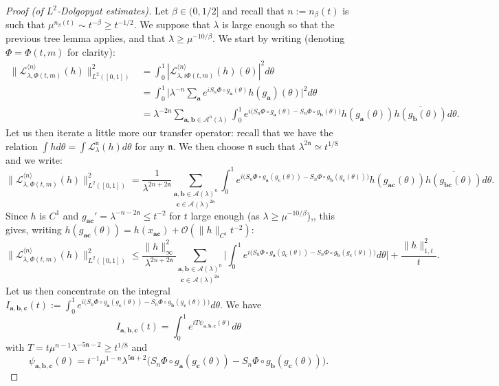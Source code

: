 \documentclass[11pt]{amsart}
\theoremstyle{plain}
\theoremstyle{definition}
\numberwithin{equation}{section}
\begin{document}
\begin{proof}[Proof (of $L^2$-Dolgopyat estimates)]
Let $\beta \in (0,1/2]$ and recall that $n := n_\beta(t)$ is such that $\mu^{n_\beta(t)} \sim t^{-\beta} \geq t^{-1/2}$. We suppose that $\lambda$ is large enough so that the previous tree lemma applies, and that $\lambda \geq \mu^{-10/\beta}.$ We start by writing (denoting $\Phi = \Phi(t,m)$ for clarity):
\begin{align*} 
\Big\| \mathcal{L}_{\lambda,\Phi(t,m)}^{\langle n \rangle}(h) \Big\|_{L^2([0,1])}^2 &= \int_0^1 |\mathcal{L}_{\lambda,i\Phi(t,m)}^{\langle n \rangle}(h)(\theta)|^2 d\theta \\
& = \int_0^1 \Big| \lambda^{-n} \sum_{\mathbf{a}} e^{i S_n \Phi \circ g_{\mathbf{a}}(\theta)} h(g_\mathbf{a})(\theta) \Big|^2 d\theta \\
& = \lambda^{-2n} \sum_{\mathbf{a},\mathbf{b} \in \mathcal{A}^n(\lambda)} \int_0^1 e^{i \big( S_n \Phi \circ g_\mathbf{a}(\theta) - S_n \Phi \circ g_\mathbf{b}(\theta) \big)} h(g_\mathbf{a}(\theta)) \overline{h(g_\mathbf{b}(\theta))} d\theta.
\end{align*}
Let us then iterate a little more our transfer operator: recall that we have the relation $\int h d\theta = \int \mathcal{L}_\lambda^{\mathfrak{n}}(h) d\theta$ for any $\mathfrak{n}$. We then choose $\mathfrak{n}$ such that $\lambda^{2\mathfrak{n}} \simeq t^{1/8}$ and we write:
$$ \Big\| \mathcal{L}_{\lambda,\Phi(t,m)}^{\langle n \rangle}(h) \Big\|_{L^2([0,1])}^2 = \frac{1}{\lambda^{2n+2 \mathfrak{n}}} \underset{\mathbf{c} \in \mathcal{A}(\lambda)^{2\mathfrak{n}}}{\sum_{\mathbf{a},\mathbf{b} \in \mathcal{A}(\lambda)^n}} \int_0^1 e^{i \big( S_n \Phi \circ g_\mathbf{a}(g_\mathbf{c}(\theta)) - S_n \Phi \circ g_\mathbf{b}(g_\mathbf{c}(\theta)) \big)} h(g_\mathbf{ac}(\theta)) \overline{h(g_\mathbf{bc}(\theta))} d\theta. $$
Since $h$ is $C^1$ and $g_{\mathbf{ac}}' = \lambda^{-n-2\mathfrak{n}} \leq t^{-2}$ for $t$ large enough (as $\lambda \geq \mu^{-10/\beta}$),, this gives, writing $h(g_{\mathbf{ac}}(\theta)) = h(x_{\mathbf{ac}})+\mathcal{O}(\|h\|_{C^1} t^{-2})$:
$$ \Big\| \mathcal{L}_{\lambda,\Phi(t,m)}^{\langle n \rangle}(h) \Big\|_{L^2([0,1])}^2 \leq \frac{\|h\|_\infty^2}{\lambda^{2n+2\mathfrak{n}}} \underset{\mathbf{c} \in \mathcal{A}(\lambda)^{2\mathfrak{n}}}{\sum_{\mathbf{a},\mathbf{b} \in \mathcal{A}(\lambda)^n}} \Big| \int_0^1 e^{i \big( S_n \Phi \circ g_\mathbf{a}(g_\mathbf{c}(\theta)) - S_n \Phi \circ g_\mathbf{b}(g_\mathbf{c}(\theta)) \big)}  d\theta \Big| + \frac{\|h\|_{{1,t}}^2}{t} .$$
Let us then concentrate on the integral $I_{\mathbf{a},\mathbf{b},\mathbf{c}}(t) := \int_0^1 e^{i \big( S_n \Phi \circ g_\mathbf{a}(g_\mathbf{c}(\theta)) - S_n \Phi \circ g_\mathbf{b}(g_\mathbf{c}(\theta)) \big)}  d\theta$. We have
$$ I_{\mathbf{a},\mathbf{b},\mathbf{c}}(t) =  \int_0^1 e^{i T \psi_{\mathbf{a},\mathbf{b},\mathbf{c}}(\theta)}  d\theta $$
with $T=t \mu^{n-1} \lambda^{-5\mathfrak{n}-2} \geq t^{1/8}$ and 
$$\psi_{\mathbf{a},\mathbf{b},\mathbf{c}}(\theta) = t^{-1} \mu^{1-n} \lambda^{5\mathfrak{n}+2} \big( S_n \Phi \circ g_\mathbf{a}(g_\mathbf{c}(\theta)) - S_n \Phi \circ g_\mathbf{b}(g_\mathbf{c}(\theta)) \big).$$


\end{proof}
\end{document}
